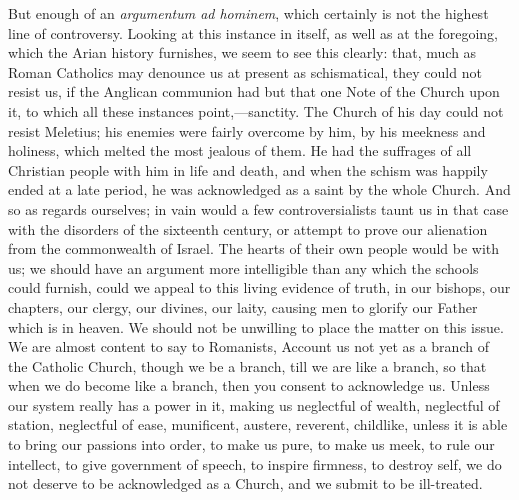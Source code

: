 But enough of an \emph{argumentum ad hominem},
which certainly is not the highest line of controversy. Looking at
this instance in itself, as well as at the foregoing, which the Arian
history furnishes, we seem to see this clearly: that, much as Roman
Catholics may denounce us at present as schismatical, they could not
resist us, if the Anglican communion had but that one Note of the
Church upon it, to which all these instances point,—sanctity. The
Church of his day could not resist Meletius; his enemies were fairly
overcome by him, by his meekness and holiness, which melted the
most jealous of them. He had the suffrages of all Christian people
with him in life and death, and when the schism was happily ended at a
late period, he was acknowledged as a saint by the whole Church. And
so as regards ourselves; in vain would a few controversialists taunt
us in that case with the disorders of the sixteenth century, or
attempt to prove our alienation from the commonwealth of Israel. The
hearts of their own people would be with us; we should have an
argument more intelligible than any which the schools could furnish,
could we appeal to this living evidence of truth, in our bishops, our
chapters, our clergy, our divines, our laity, causing men to glorify
our Father which is in heaven. We should not be unwilling to place the
matter on this issue. We are almost content to say to Romanists,
Account us not yet as a branch of the Catholic Church, though we be a
branch, till we are like a branch, so that when we do become like a
branch, then you consent to acknowledge us. Unless our system really
has a power in it, making us neglectful of wealth, neglectful of
station, neglectful of ease, munificent, austere, reverent, childlike,
unless it is able to bring our passions into order, to make us pure,
to make us meek, to rule our intellect, to give government of speech,
to inspire firmness, to destroy self, we do not deserve to be
acknowledged as a Church, and we submit to be ill-treated.

